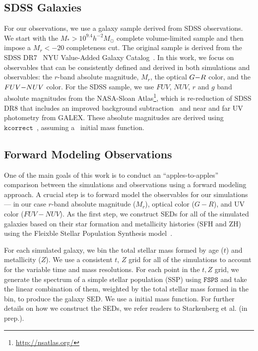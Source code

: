 \subsection{SDSS Galaxies} \label{sec:obs} 
For our observations, we use a galaxy sample derived from SDSS observations. We
start with the $M_* > 10^{9.4} h^{-2}M_\odot$ complete \cite{tinker2011}
volume-limited sample and then impose a $M_r < -20$ completeness cut. 
The original \cite{tinker2011} sample is derived from the SDSS DR7~\citep{abazajian2009} NYU
Value-Added Galaxy Catalog~\citep[VAGC;][]{blanton2005}. In this work, we focus 
on observables that can be consistently defined and derived in both simulations 
and observables: the $r$-band absolute magnitude, $M_r$, the optical $G{-}R$
color, and the $FUV{-}NUV$ color. For the SDSS sample, we use $FUV$,
$NUV$, $r$ and $g$ band absolute magnitudes from the NASA-Sloan
Atlas\footnote{\url{http://nsatlas.org/}}, which is re-reduction of SDSS DR8
\citep{aihara2011} that includes an improved background subtraction~\citep{blanton2011} 
and near and far UV photometry from GALEX. These absolute magnitudes are
derived using $\mathtt{kcorrect}$~\citep{blanton2007a}, assuming
a~\cite{chabrier2003} initial mass function. 

\subsection{Forward Modeling Observations} \label{sec:fm} 
One of the main goals of this work is to conduct an ``apples-to-apples'' comparison
between the simulations and observations using a forward modeling
approach. A crucial step is to forward model the observables for our
simulations --- in our case $r$-band absolute magnitude ($M_r$), optical color
($G-R$), and UV color ($FUV-NUV$). As the first step, we construct SEDs for
all of the simulated galaxies based on their star formation and metallicity
histories (SFH and ZH) using the Fleixble Stellar Population Synthesis model~\citep[$\mathtt{FSPS}$;][]{conroy2009, conroy2010}. 

For each simulated galaxy, we bin the total stellar mass formed by age ($t$)
and metallicity ($Z$). We use a consistent $t$, $Z$ grid for all of the simulations
to account for the variable time and mass resolutions. For each point in the
$t, Z$ grid, we generate the spectrum of a simple stellar population (SSP)
using $\mathtt{FSPS}$ and take the linear combination of them, weighted by 
the total stellar mass formed in the bin, to produce the galaxy SED. We use a
\cite{chabrier2003} initial mass function. For further details on how we
construct the SEDs, we refer readers to Starkenberg et al. (in prep.).

